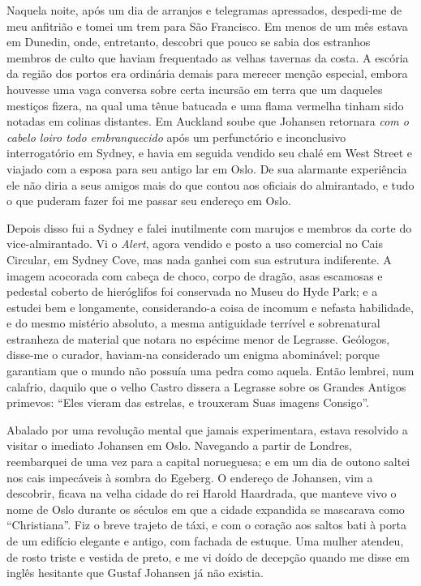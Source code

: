 \begin{pages}
\begin{Rightside}
Naquela noite, após um dia de arranjos e telegramas apressados,
despedi-me de meu anfitrião e tomei um trem para São Francisco. Em menos
de um mês estava em Dunedin, onde, entretanto, descobri que pouco se
sabia dos estranhos membros de culto que haviam frequentado as velhas
tavernas da costa. A escória da região dos portos era ordinária demais
para merecer menção especial, embora houvesse uma vaga conversa sobre
certa incursão em terra que um daqueles mestiços fizera, na qual uma
tênue batucada e uma flama vermelha tinham sido notadas em colinas
distantes. Em Auckland soube que Johansen retornara \emph{com o cabelo
loiro todo embranquecido} após um perfunctório e inconclusivo
interrogatório em Sydney, e havia em seguida vendido seu chalé em West
Street e viajado com a esposa para seu antigo lar em Oslo. De sua
alarmante experiência ele não diria a seus amigos mais do que contou aos
oficiais do almirantado, e tudo o que puderam fazer foi me passar seu
endereço em Oslo.

Depois disso fui a Sydney e falei inutilmente com marujos e membros da
corte do vice-almirantado. Vi o \emph{Alert}, agora vendido e posto a
uso comercial no Cais Circular, em Sydney Cove, mas nada ganhei com sua
estrutura indiferente. A imagem acocorada com cabeça de choco, corpo de
dragão, asas escamosas e pedestal coberto de hieróglifos foi conservada
no Museu do Hyde Park; e a estudei bem e longamente, considerando-a
coisa de incomum e nefasta habilidade, e do mesmo mistério absoluto, a
mesma antiguidade terrível e sobrenatural estranheza de material que
notara no espécime menor de Legrasse. Geólogos, disse-me o curador,
haviam-na considerado um enigma abominável; porque garantiam que o mundo
não possuía uma pedra como aquela. Então lembrei, num calafrio, daquilo
que o velho Castro dissera a Legrasse sobre os Grandes Antigos primevos:
``Eles vieram das estrelas, e trouxeram Suas imagens Consigo''.

Abalado por uma revolução mental que jamais experimentara, estava
resolvido a visitar o imediato Johansen em Oslo. Navegando a partir de
Londres, reembarquei de uma vez para a capital norueguesa; e em um dia
de outono saltei nos cais impecáveis à sombra do Egeberg. O endereço de Johansen, vim a descobrir, ficava na velha
cidade do rei Harold Haardrada, que manteve vivo o nome de Oslo durante
os séculos em que a cidade expandida se mascarava como
``Christiana''. Fiz o breve trajeto de táxi, e com o coração aos
saltos bati à porta de um edifício elegante e antigo, com fachada de
estuque. Uma mulher atendeu, de rosto triste e vestida de preto, e me vi
doído de decepção quando me disse em inglês hesitante que Gustaf
Johansen já não existia.


\end{Rightside}
\end{pages}
